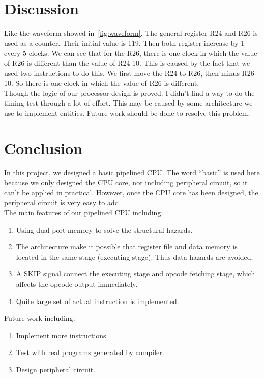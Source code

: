\documentclass[12pt,a4paper]{report}
\begin{document}
\clearpage
%
%
%

\section{Discussion}
Like the waveform showed in~\ref{fig:waveform}. The general register R24 and R26 is used as a counter. Their initial value is 119. Then both register increase by 1 every 5 clocks. We can see that for the R26, there is one clock in which the value of R26 is different than the value of R24-10. This is caused by the fact that we used two instructions to do this. We first move the R24 to R26, then minus R26-10. So there is one clock in which the value of R26 is different. \\
Though the logic of our processor design is proved. I didn't find a way to do the timing test through a lot of effort. This may be caused by some architecture we use to implement entities. Future work should be done to resolve this problem.\\
\section{Conclusion}
In this project, we designed a basic pipelined CPU. The word ``basic'' is used here because we only designed the CPU core, not including peripheral circuit, so it can't be applied in practical. However, once the CPU core has been designed, the peripheral circuit is very easy to add.\\
The main features of our pipelined CPU including:
\begin{enumerate}
  \item Using dual port memory to solve the structural hazards.
  \item The architecture make it possible that register file and data memory is located in the same stage (executing stage). Thus data hazards are avoided.
  \item A SKIP signal connect the executing stage and opcode fetching stage, which affects the opcode output immediately.
  \item Quite large set of actual instruction is implemented.
\end{enumerate}
Future work including:
\begin{enumerate}
  \item Implement more instructions.
  \item Test with real programs generated by compiler.
  \item Design peripheral circuit.
\end{enumerate}
\end{document}
